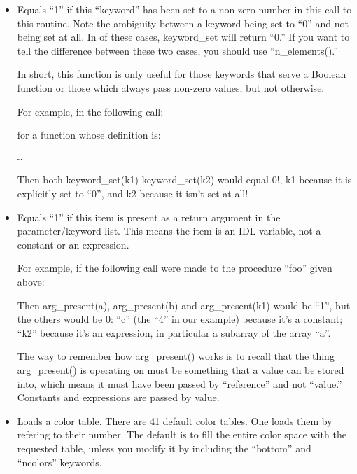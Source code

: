 \begin{itemize}
    \item {}

      Equals ``1'' if this ``keyword'' has been set to a non-zero
  number in this call to this routine. Note the ambiguity between a
  keyword being set to ``0'' and not being set at all. In 
  of these cases, keyword\_set will return ``0.'' If you want to
  tell the difference between these two cases, you should use
  ``n\_elements().''

      In short, this function is only useful for those keywords that
      serve a Boolean function or those which always pass non-zero
      values, but not otherwise.

      For example, in the following call:

         for a function whose definition is:

\begin{alltt}
   \ldots
\end{alltt}

        
     Then both keyword\_set(k1)  keyword\_set(k2) would
      equal 0!, k1 because it is explicitly set to ``0'', and k2
      because it isn't set at all!

    \item {}

      Equals ``1'' if this item is present as a return argument in the
      parameter/keyword list. This means the item is an IDL variable,
      not a constant or an expression. 

      For example, if the following call were made to the procedure
      ``foo'' given above:


      Then arg\_present(a), arg\_present(b) and arg\_present(k1) would
      be ``1'', but the others would be 0: ``c'' (the ``4'' in our
      example) because it's a constant; ``k2'' because it's an
      expression, in particular a subarray of the array ``a''.

      The way to remember how arg\_present() works is to recall that the
      thing arg\_present() is operating on must be something that a
      value can be stored into, which means it must have been passed
      by ``reference'' and not ``value.'' Constants and expressions
      are passed by value.

    \item {} Loads a color table. There are 41 default
           color tables. One loads them by refering to their
           number. The default is to fill the entire color space
           with the requested table, unless you modify it by including
           the ``bottom'' and ``ncolors'' keywords.
  \end{itemize}


